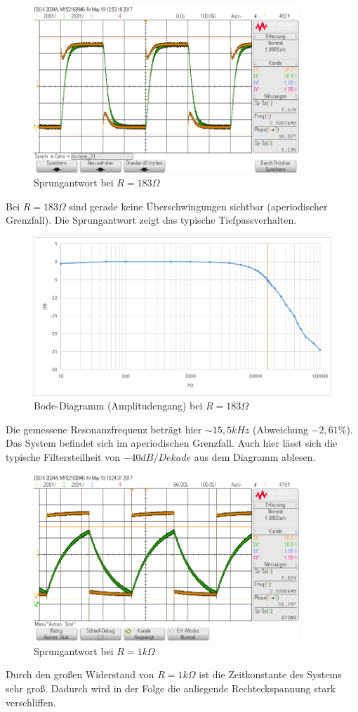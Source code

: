 \documentclass[12pt,a4paper,titlepage]{article}
\begin{document}
\begin{figure}[H]
  \centering
  \includegraphics[width=100mm]{sprungantwort_rlc_180.png}
  \caption{Sprungantwort bei $R=183\Omega$}
\end{figure}
\noindent Bei $R=183\Omega$ sind gerade keine \"Uberschwingungen sichtbar (aperiodischer Grenzfall). Die Sprungantwort zeigt das typische Tiefpassverhalten.

\begin{figure}[H]
  \centering
  \includegraphics[width=150mm]{bode_rlc_180.png}
  \caption{Bode-Diagramm (Amplitudengang) bei $R=183\Omega$}
\end{figure}
\noindent Die gemessene Resonanzfrequenz betr\"agt hier $\sim15,5kHz$ (Abweichung $-2,61\%$). Das System befindet sich im aperiodischen Grenzfall. Auch hier lässt sich die typische Filtersteilheit von $-40dB/Dekade$ aus dem Diagramm ablesen.\\

\begin{figure}[H]
  \centering
  \includegraphics[width=100mm]{sprungantwort_rlc_1k.png}
  \caption{Sprungantwort bei $R=1k\Omega$}
\end{figure}
\noindent Durch den großen Widerstand von $R=1k\Omega$ ist die Zeitkonstante des Systems sehr groß. Dadurch wird in der Folge die anliegende Rechteckspannung stark verschliffen.
\end{document}
